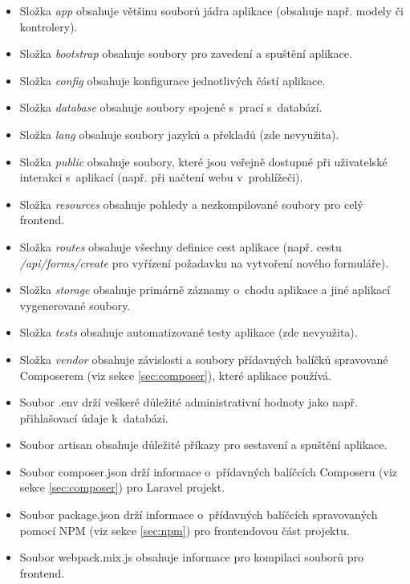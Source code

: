 	\begin{itemize}
		\item Složka \textit{app} obsahuje většinu souborů jádra aplikace (obsahuje např. modely či kontrolery). \cite{LaravelDir}
		\item Složka \textit{bootstrap} obsahuje soubory pro zavedení a spuštění aplikace. \cite{LaravelDir}
		\item Složka \textit{config} obsahuje konfigurace jednotlivých částí aplikace. \cite{LaravelDir}
		\item Složka \textit{database} obsahuje soubory spojené s~prací s~databází. \cite{LaravelDir}
		\item Složka \textit{lang} obsahuje soubory jazyků a překladů (zde nevyužita). \cite{LaravelDir}
		\item Složka \textit{public} obsahuje soubory, které jsou veřejně dostupné při uživatelské interakci s~aplikací (např. při načtení webu v~prohlížeči). \cite{LaravelDir}
		\item Složka \textit{resources} obsahuje pohledy a nezkompilované soubory pro celý frontend. \cite{LaravelDir}
		\item Složka \textit{routes} obsahuje všechny definice cest aplikace (např. cestu \textit{/api/forms/create} pro vyřízení požadavku na vytvoření nového formuláře). \cite{LaravelDir}
		\item Složka \textit{storage} obsahuje primárně záznamy o~chodu aplikace a jiné aplikací vygenerované soubory. \cite{LaravelDir}
		\item Složka \textit{tests} obsahuje automatizované testy aplikace (zde nevyužita). \cite{LaravelDir}
		\item Složka \textit{vendor} obsahuje závislosti a soubory přídavných balíčků spravované Composerem (viz sekce \ref{sec:composer}), které aplikace používá. \cite{LaravelDir}
		\item Soubor .env drží veškeré důležité administrativní hodnoty jako např. přihlašovací údaje k~databázi.
		\item Soubor artisan obsahuje důležité příkazy pro sestavení a spuštění aplikace. \cite{LaravelArtisan}
		\item Soubor composer.json drží informace o~přídavných balíčcích Composeru (viz sekce \ref{sec:composer}) pro Laravel projekt. \cite{ComposerpJSON}
		\item Soubor package.json drží informace o~přídavných balíčcích spravovaných pomocí NPM (viz sekce \ref{sec:npm}) pro frontendovou část projektu. \cite{NPMpJSON}
		\item Soubor webpack.mix.js obsahuje informace pro kompilaci souborů pro frontend. \cite{LaravelJSCSS}
	\end{itemize}

